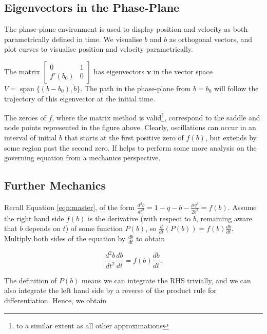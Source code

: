 \documentclass{article}
\begin{document}
\subsection{Eigenvectors in the Phase-Plane}

The phase-plane environment is used to display position and velocity as both parametrically defined in time.
We visualise $b$ and $\dot{b}$ as orthogonal vectors, and plot curves to visualise position and velocity parametrically.


The matrix $\begin{bmatrix}
	0 & 1 \\
	f'(b_0) & 0
\end{bmatrix}$ has eigenvectors $\mathbf{v}$ in the vector space $V = \operatorname{span}\{(b-b_0),\dot{b}\}$.
The path in the phase-plane from $b=b_0$ will follow the trajectory of this eigenvector at the initial time.


The zeroes of $f$, where the matrix method is valid\footnote{to a similar extent as all other approximations},
correspond to the saddle and node points represented in the figure above. %
Clearly, oscillations can occur in an interval of initial $b$ that starts at the first positive zero of $f(b)$,
but extends by some region past the second zero.
If helps to perform some more analysis on the governing equation from a mechanics perspective.

\subsection{Further Mechanics}

Recall Equation \ref{eqn:master}, of the form $\frac{d^2b}{dt^2} = 1 - q - b - \frac{\mu q^2}{2 b^2} = f(b)$.
Assume the right hand side $f(b)$ is the derivative (with respect to $b$, remaining aware that $b$ depends on $t$) of some function $P(b)$,
so $\frac{d}{dt}\left(P(b)\right) = f(b)\frac{db}{dt}.$ %
Multiply both sides of the equation by $\frac{db}{dt}$ to obtain

\begin{equation*}
    \frac{d^2b}{dt^2} \frac{db}{dt} = f(b) \frac{db}{dt}.
\end{equation*}

The definition of $P(b)$ means we can integrate the RHS trivially,
and we can also integrate the left hand side by a reverse of the product rule for differentiation.
Hence, we obtain
\end{document}
